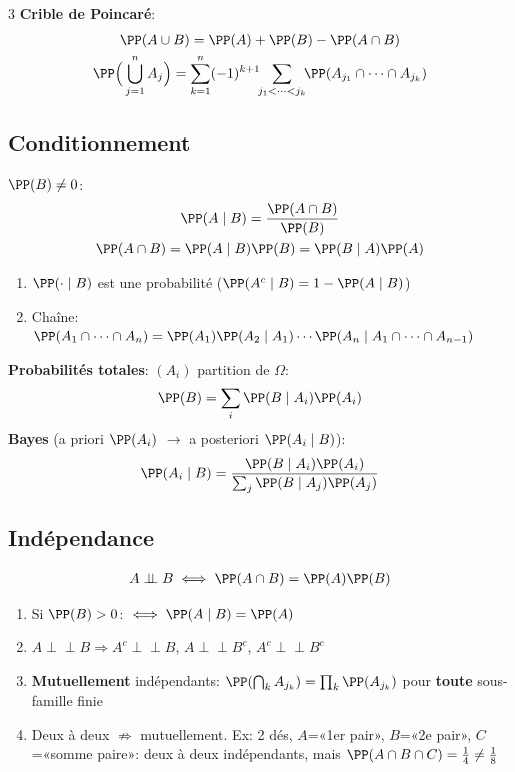 \documentclass[12pt, a4paper]{article}
\begin{document}
\begin{multicols*}{3}
	\textbf{Crible de Poincaré}:
	\begin{gather*}
		\PP(A\cup B)=\PP(A)+\PP(B)-\PP(A\cap B)\\
		\PP\Big(\bigcup_{j=1}^nA_j\Big)=\sum_{k=1}^n(-1)^{k+1}\!\!\sum_{j_1<\dots<j_k}\!\!\PP(A_{j_1}\cap\dots\cap A_{j_k})
	\end{gather*}

	\colbreak
	\subsection{Conditionnement}
	$\PP(B)\neq0$:
	\begin{gather*}
		\PP(A\mid B)=\frac{\PP(A\cap B)}{\PP(B)}\\
		\PP(A\cap B)=\PP(A\mid B)\PP(B)=\PP(B\mid A)\PP(A)
	\end{gather*}
	\begin{enumerate}[\roman*.]
		\item $\PP(\cdot\mid B)$ est une probabilité ($\PP(A^c\mid B)=1-\PP(A\mid B)$)
		\item Chaîne: $\PP(A_1\cap\dots\cap A_n)=\PP(A_1)\PP(A_2\mid A_1)\cdots\PP(A_n\mid A_1\cap\dots\cap A_{n-1})$
	\end{enumerate}
	\textbf{Probabilités totales}: $(A_i)$ partition de $\Omega$:
	\begin{gather*}
		\PP(B)=\sum_i\PP(B\mid A_i)\PP(A_i)
	\end{gather*}
	\textbf{Bayes} (a priori $\PP(A_i)$ $\to$ a posteriori $\PP(A_i\mid B)$):
	\begin{gather*}
		\PP(A_i\mid B)=\frac{\PP(B\mid A_i)\PP(A_i)}{\sum_j\PP(B\mid A_j)\PP(A_j)}
	\end{gather*}

	\subsection{Indépendance}
	\begin{gather*}
		A\perp\!\!\!\perp B\iff\PP(A\cap B)=\PP(A)\PP(B)
	\end{gather*}
	\begin{enumerate}[\roman*.]
		\item Si $\PP(B)>0$: $\iff\PP(A\mid B)=\PP(A)$
		\item $A\perp\!\!\!\perp B\Rightarrow A^c\perp\!\!\!\perp B$, $A\perp\!\!\!\perp B^c$, $A^c\perp\!\!\!\perp B^c$
		\item \textbf{Mutuellement} indépendants: $\PP(\bigcap_kA_{j_k})=\prod_k\PP(A_{j_k})$ pour \textbf{toute} sous-famille finie
		\item Deux à deux $\not\Rightarrow$ mutuellement. Ex: 2 dés, $A$=«1er pair», $B$=«2e pair», $C$=«somme paire»: deux à deux indépendants, mais $\PP(A\cap B\cap C)=\frac14\neq\frac18$
	\end{enumerate}


\end{multicols*}
\end{document}
